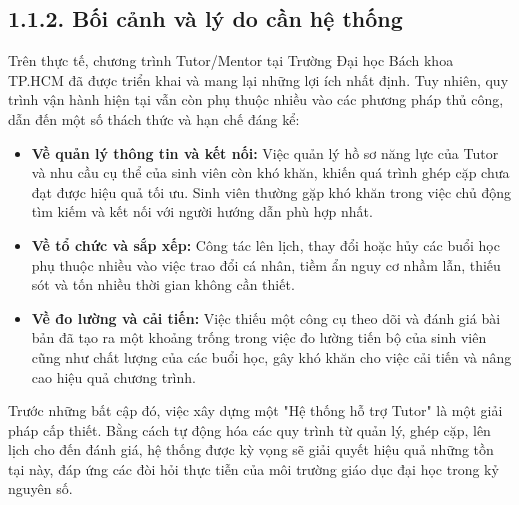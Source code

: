 \subsection*{1.1.2. Bối cảnh và lý do cần hệ thống}
Trên thực tế, chương trình Tutor/Mentor tại Trường Đại học Bách khoa TP.HCM đã được triển khai và mang lại những lợi ích nhất định. Tuy nhiên, quy trình vận hành hiện tại vẫn còn phụ thuộc nhiều vào các phương pháp thủ công, dẫn đến một số thách thức và hạn chế đáng kể:
\begin{itemize}
    \item \textbf{Về quản lý thông tin và kết nối:} Việc quản lý hồ sơ năng lực của Tutor và nhu cầu cụ thể của sinh viên còn khó khăn, khiến quá trình ghép cặp chưa đạt được hiệu quả tối ưu. Sinh viên thường gặp khó khăn trong việc chủ động tìm kiếm và kết nối với người hướng dẫn phù hợp nhất.
    \item \textbf{Về tổ chức và sắp xếp:} Công tác lên lịch, thay đổi hoặc hủy các buổi học phụ thuộc nhiều vào việc trao đổi cá nhân, tiềm ẩn nguy cơ nhầm lẫn, thiếu sót và tốn nhiều thời gian không cần thiết.
    \item \textbf{Về đo lường và cải tiến:} Việc thiếu một công cụ theo dõi và đánh giá bài bản đã tạo ra một khoảng trống trong việc đo lường tiến bộ của sinh viên cũng như chất lượng của các buổi học, gây khó khăn cho việc cải tiến và nâng cao hiệu quả chương trình.
\end{itemize}
Trước những bất cập đó, việc xây dựng một "Hệ thống hỗ trợ Tutor" là một giải pháp cấp thiết. Bằng cách tự động hóa các quy trình từ quản lý, ghép cặp, lên lịch cho đến đánh giá, hệ thống được kỳ vọng sẽ giải quyết hiệu quả những tồn tại này, đáp ứng các đòi hỏi thực tiễn của môi trường giáo dục đại học trong kỷ nguyên số.


